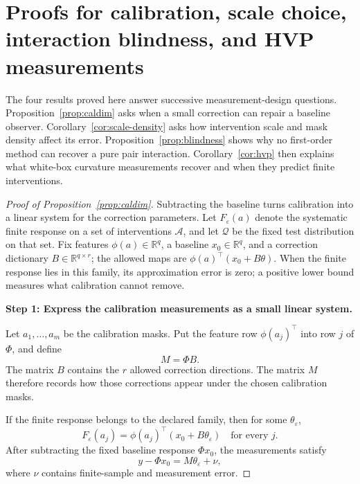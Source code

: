 \documentclass[sigconf,10pt,nonacm,balance=false]{acmart}
\newcommand{\eps}{\varepsilon}
\newcommand{\R}{\mathbb{R}}
\begin{document}
\section{Proofs for calibration, scale choice, interaction blindness, and HVP measurements}
\label{app:remaining-proofs}

The four results proved here answer successive measurement-design questions. Proposition~\ref{prop:caldim} asks when a small correction can repair a baseline observer. Corollary~\ref{cor:scale-density} asks how intervention scale and mask density affect its error. Proposition~\ref{prop:blindness} shows why no first-order method can recover a pure pair interaction. Corollary~\ref{cor:hvp} then explains what white-box curvature measurements recover and when they predict finite interventions.

\begin{proof}[Proof of Proposition~\ref{prop:caldim}]
Subtracting the baseline turns calibration into a linear system for the correction parameters. Let $F_\eps(a)$ denote the systematic finite response on a set of interventions $\mathcal A$, and let $\mathcal Q$ be the fixed test distribution on that set. Fix features $\phi(a)\in\R^q$, a baseline $x_0\in\R^q$, and a correction dictionary $B\in\R^{q\times r}$; the allowed maps are $\phi(a)^\top(x_0+B\theta)$. When the finite response lies in this family, its approximation error is zero; a positive lower bound measures what calibration cannot remove.

\noindent\textbf{Step 1: Express the calibration measurements as a small linear system.}\par
Let $a_1,\ldots,a_m$ be the calibration masks. Put the feature row $\phi(a_j)^\top$ into row $j$ of $\Phi$, and define
\[
    M=\Phi B.
\]
The matrix $B$ contains the $r$ allowed correction directions. The matrix $M$ therefore records how those corrections appear under the chosen calibration masks.

If the finite response belongs to the declared family, then for some $\theta_\eps$,
\begin{equation}
    F_\eps(a_j)
    =
    \phi(a_j)^\top(x_0+B\theta_\eps)
    \quad\text{for every }j.
\end{equation}
After subtracting the fixed baseline response $\Phi x_0$, the measurements satisfy
\begin{equation}
    y-\Phi x_0=M\theta_\eps+\nu,
\end{equation}
where $\nu$ contains finite-sample and measurement error.


\end{proof}
\end{document}

